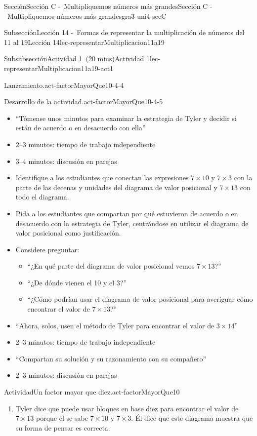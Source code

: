 \documentclass[oneside,10pt,]{article}
\begin{document}
\begin{sectionptx}{Sección}{Sección C -~Multipliquemos números más grandes}{}{Sección C -~Multipliquemos números más grandes}{}{}{gra3-uni4-secC}
\begin{subsectionptx}{Subsección}{Lección 14 -~Formas de representar la multiplicación de números del 11 al 19}{}{Lección 14}{}{}{lec-representarMultiplicacion11a19}
\begin{subsubsectionptx}{Subsubsección}{Actividad 1~(20 mins)}{}{Actividad 1}{}{}{lec-representarMultiplicacion11a19-act1}
\begin{paragraphs}{Lanzamiento.}{act-factorMayorQue10-4-4}
\end{paragraphs}%
\begin{paragraphs}{Desarrollo de la actividad.}{act-factorMayorQue10-4-5}%
%
\begin{itemize}[label=\textbullet]
\item{}``Tómense unos minutos para examinar la estrategia de Tyler y decidir si están de acuerdo o en desacuerdo con ella''%
\item{}2–3 minutos: tiempo de trabajo independiente%
\item{}3–4 minutos: discusión en parejas%
\item{}Identifique a los estudiantes que conectan las expresiones \(7 \times 10\) y \(7 \times 3\) con la parte de las decenas y unidades del diagrama de valor posicional y \(7 \times 13\) con todo el diagrama.%
\item{}Pida a los estudiantes que compartan por qué estuvieron de acuerdo o en desacuerdo con la estrategia de Tyler, centrándose en utilizar el diagrama de valor posicional como justificación.%
\item{}Considere preguntar:%
%
\begin{itemize}[label=$\circ$]
\item{}``¿En qué parte del diagrama de valor posicional vemos \(7 \times 13\)?''%
\item{}``¿De dónde vienen el 10 y el 3?''%
\item{}``¿Cómo podrían usar el diagrama de valor posicional para averiguar cómo encontrar el valor de \(7 \times 13\)?''%
\end{itemize}
\item{}``Ahora, solos, usen el método de Tyler para encontrar el valor de \(3 \times 14\)''%
\item{}2–3 minutos: tiempo de trabajo independiente%
\item{}``Compartan su solución y su razonamiento con su compañero''%
\item{}2–3 minutos: discusión en parejas%
\end{itemize}
\end{paragraphs}%
\begin{activity}{Actividad}{Un factor mayor que diez.}{act-factorMayorQue10}%
%
\begin{enumerate}
\item{}Tyler dice que puede usar bloques en base diez para encontrar el valor de \(7\times 13\) porque él se sabe \(7\times 10\) y \(7\times 3\). Él dice que este diagrama muestra que su forma de pensar es correcta.%

\end{enumerate}
\end{activity}
\end{subsubsectionptx}
\end{subsectionptx}
\end{sectionptx}
\end{document}
